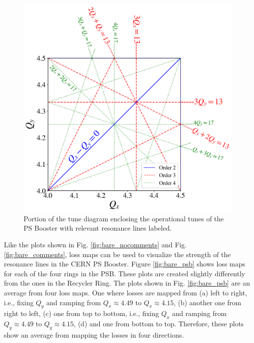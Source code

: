 \begin{figure}[H]
    \centering
    \includegraphics[width=\linewidth]{chapter5/psb_td.png}
    \caption{Portion of the tune diagram enclosing the operational tunes of the PS Booster with relevant resonance lines labeled.}
    \label{fig:psbtd}
   \vspace{-1.25em}
\end{figure}

Like the plots shown in Fig. \ref{fig:bare_nocomments} and Fig. \ref{fig:bare_comments}, loss maps can be used to visualize the strength of the resonance lines in the CERN PS Booster. Figure \ref{fig:bare_psb} shows loss maps for each of the four rings in the PSB. These plots are created slightly differently from the ones in the Recycler Ring. The plots shown in Fig. \ref{fig:bare_psb} are an average from four loss maps. One where losses are mapped from (a) left to right, i.e., fixing $Q_y$ and ramping from $Q_x \approx 4.49$ to $Q_x \approx 4.15$, (b) another one from right to left, (c) one from top to bottom, i.e., fixing $Q_x$ and ramping from $Q_y \approx 4.49$ to $Q_y \approx 4.15$, (d) and one from bottom to top. Therefore, these plots show an average from mapping the losses in four directions.    

